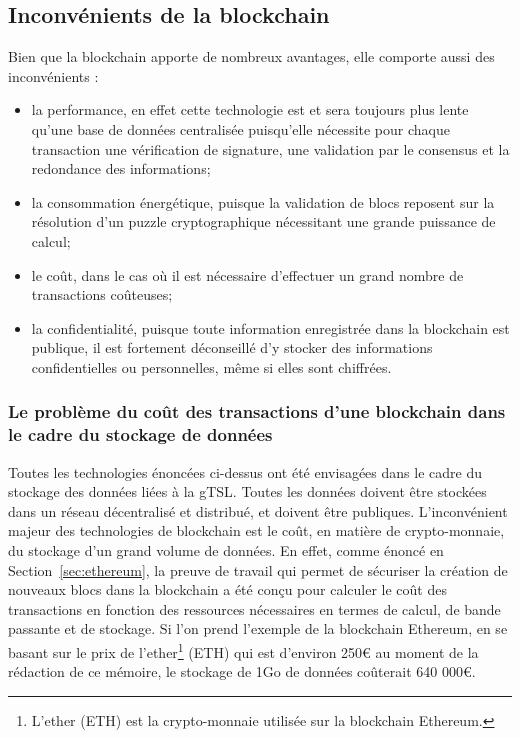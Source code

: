 \documentclass{tnreport}
\begin{document}
\subsection{Inconvénients de la blockchain}
\label{sec:drawbacks-blockchain}

Bien que la blockchain apporte de nombreux avantages, elle comporte aussi des inconvénients :
\begin{itemize}
	\item la performance, en effet cette technologie est et sera toujours plus lente qu'une base de données centralisée puisqu'elle nécessite pour chaque transaction une vérification de signature, une validation par le consensus et la redondance des informations; 
	\item la consommation énergétique, puisque la validation de blocs reposent sur la résolution d'un puzzle cryptographique nécessitant une grande puissance de calcul; 
	\item le coût, dans le cas où il est nécessaire d'effectuer un grand nombre de transactions coûteuses;
	\item la confidentialité, puisque toute information enregistrée dans la blockchain est publique, il est fortement déconseillé d'y stocker des informations confidentielles ou personnelles, même si elles sont chiffrées.
\end{itemize}

\subsubsection{Le problème du coût des transactions d'une blockchain dans le cadre du stockage de données}

Toutes les technologies énoncées ci-dessus ont été envisagées dans le cadre du stockage des données liées à la gTSL. Toutes les données doivent être stockées dans un réseau décentralisé et distribué, et doivent être publiques. L'inconvénient majeur des technologies de blockchain est le coût, en matière de crypto-monnaie, du stockage d'un grand volume de données. En effet, comme énoncé en Section~\ref{sec:ethereum}, la preuve de travail qui permet de sécuriser la création de nouveaux blocs dans la blockchain a été conçu pour calculer le coût des transactions en fonction des ressources nécessaires en termes de calcul, de bande passante et de stockage. Si l'on prend l'exemple de la blockchain Ethereum, en se basant sur le prix de l'ether\footnote{L'ether (ETH) est la crypto-monnaie utilisée sur la blockchain Ethereum.} (ETH) qui est d'environ 250€ au moment de la rédaction de ce mémoire, le stockage de 1Go de données coûterait 640 000€.
\end{document}
